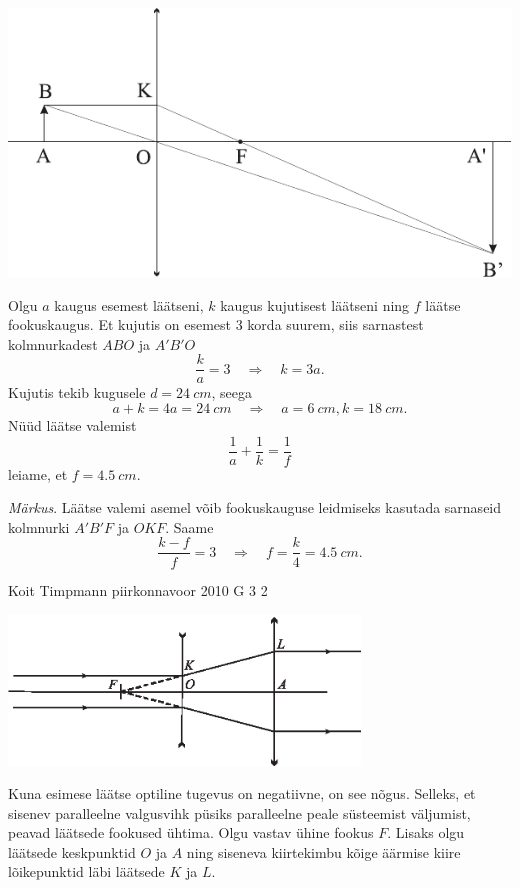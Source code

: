 \documentclass[11pt]{article}
\begin{document}
{{\begin{center}
	\includegraphics[width=0.9\linewidth]{2009-lahg-02-lah}
\end{center}

Olgu $a$ kaugus esemest läätseni, $k$ kaugus kujutisest läätseni ning $f$ läätse fookuskaugus. Et kujutis on esemest \num{3} korda suurem, siis sarnastest kolmnurkadest $ABO$ ja $A'B'O$
\[
\frac{k}{a}=3 \quad \Rightarrow \quad k=3 a.
\]
Kujutis tekib kugusele $d = \SI{24}{cm}$, seega
\[
a+k=4 a=\SI{24}{cm} \quad \Rightarrow \quad a=\SI{6}{cm}, k=\SI{18}{cm}.
\]
Nüüd läätse valemist
\[
\frac{1}{a}+\frac{1}{k}=\frac{1}{f}
\]
leiame, et $f = \SI{4,5}{cm}$.

\emph{Märkus}. Läätse valemi asemel võib fookuskauguse leidmiseks kasutada sarnaseid kolmnurki $A'B'F$ ja $OKF$. Saame
\[
\frac{k-f}{f}=3 \quad \Rightarrow \quad f=\frac{k}{4}=\SI{4,5}{cm}.
\]
\fi
}

{Koit Timpmann} %
{piirkonnavoor} %
{2010} %
{G 3} %
{2} %
{

\ifSolution
\begin{center}
	\includegraphics[width=0.7\textwidth]{2010-v2g-03-laiendi.eps}
\end{center}

Kuna esimese läätse optiline tugevus on negatiivne, on see nõgus. Selleks, et sisenev paralleelne valgusvihk püsiks paralleelne peale süsteemist väljumist, peavad läätsede fookused ühtima. Olgu vastav ühine fookus $F$. Lisaks olgu läätsede keskpunktid $O$ ja $A$ ning siseneva kiirtekimbu kõige äärmise kiire lõikepunktid läbi läätsede $K$ ja $L$.

}}
\end{document}
